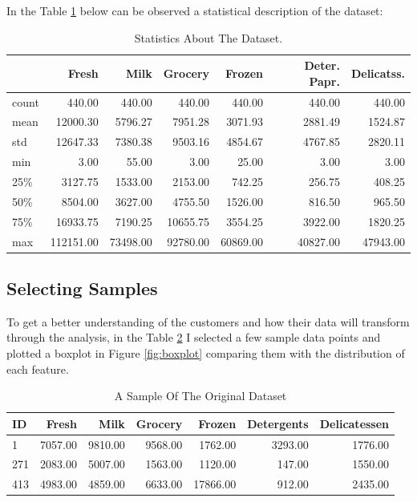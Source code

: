 \documentclass[a4paper]{article}
\begin{document}
In the Table \ref{tab:basicfacts} below can be observed a statistical description of the dataset:

\begin{table}[ht!]
\centering
\begin{tabular}{l|rrrrrr}
{} &      Fresh &      Milk &   Grocery &    Frozen & Deter. Papr. & Delicatss. \\\hline
count &     440.00 &    440.00 &    440.00 &    440.00 &           440.00 &       440.00 \\
mean  &   12000.30 &   5796.27 &   7951.28 &   3071.93 &          2881.49 &      1524.87 \\
std   &   12647.33 &   7380.38 &   9503.16 &   4854.67 &          4767.85 &      2820.11 \\
min   &       3.00 &     55.00 &      3.00 &     25.00 &             3.00 &         3.00 \\
25\%   &    3127.75 &   1533.00 &   2153.00 &    742.25 &           256.75 &       408.25 \\
50\%   &    8504.00 &   3627.00 &   4755.50 &   1526.00 &           816.50 &       965.50 \\
75\%   &   16933.75 &   7190.25 &  10655.75 &   3554.25 &          3922.00 &      1820.25 \\
max   &  112151.00 &  73498.00 &  92780.00 &  60869.00 &         40827.00 &     47943.00 \\

\end{tabular}
\caption{\label{tab:basicfacts}Statistics About The Dataset.}
\end{table}

\subsection{Selecting Samples}
To get a better understanding of the customers and how their data will transform through the analysis, in the Table \ref{tab:sample} I selected a few sample data points and plotted a boxplot in Figure \ref{fig:boxplot} comparing them with the distribution of each feature.

\begin{table}[ht!]
\centering
\begin{tabular}{l|rrrrrr}
{ID} &    Fresh &     Milk &  Grocery &    Frozen & Detergents & Delicatessen \\\hline
1   &  7057.00 &  9810.00 &  9568.00 &   1762.00 &          3293.00 &      1776.00 \\
271 &  2083.00 &  5007.00 &  1563.00 &   1120.00 &           147.00 &      1550.00 \\
413 &  4983.00 &  4859.00 &  6633.00 &  17866.00 &           912.00 &      2435.00 \\

\end{tabular}
\caption{\label{tab:sample}A Sample Of The Original Dataset}
\end{table}
\end{document}
